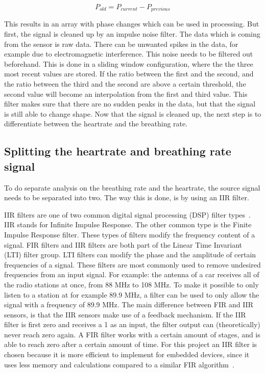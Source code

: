 \begin{equation}
    \label{eq:phase_difference}
    P_{old} = P_{current} - P_{previous}
\end{equation}

This results in an array with phase changes which can be used in processing. But first, the signal is cleaned up by an impulse noise filter. The data which is coming from the sensor is raw data. There can be unwanted spikes in the data, for example due to electromagnetic interference. This noise needs to be filtered out beforehand. This is done in a sliding window configuration, where the the three most recent values are stored. If the ratio between the first and the second, and the ratio between the third and the second are above a certain threshold, the second value will become an interpolation from the first and third value. This filter makes sure that there are no sudden peaks in the data, but that the signal is still able to change shape. Now that the signal is cleaned up, the next step is to differentiate between the heartrate and the breathing rate.

\subsection{Splitting the heartrate and breathing rate signal}
To do separate analysis on the breathing rate and the heartrate, the source signal needs to be separated into two. The way this is done, is by using an IIR filter.

IIR filters are one of two common digital signal processing (DSP) filter types~\cite{iir_info_website}. IIR stands for Infinite Impulse Response. The other common type is the Finite Impulse Response filter. These types of filters modify the frequency content of a signal. FIR filters and IIR filters are both part of the Linear Time Invariant (LTI) filter group. LTI filters can modify the phase and the amplitude of certain frequencies of a signal. These filters are most commonly used to remove undesired frequencies from an input signal. For example: the antenna of a car receives all of the radio stations at once, from 88 MHz to 108 MHz. To make it possible to only listen to a station at for example 89.9 MHz, a filter can be used to only allow the signal with a frequency of 89.9 MHz. The main difference between FIR and IIR sensors, is that the IIR sensors make use of a feedback mechanism. If the IIR filter is first zero and receives a 1 as an input, the filter output can (theoretically) never reach zero again. A FIR filter works with a certain amount of stages, and is able to reach zero after a certain amount of time. For this project an IIR filter is chosen because it is more efficient to implement for embedded devices, since it uses less memory and calculations compared to a similar FIR algorithm~\cite{iir_faq_website}. 

